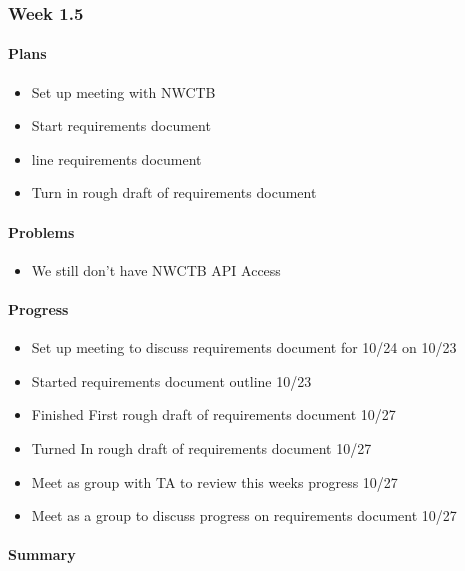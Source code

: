 \documentclass[onecolumn, draftclsnofoot,10pt, compsoc]{article}
\begin{document}
		\subsubsection{Week 1.5}
			\paragraph{Plans} \hfill \break

		        \begin{itemize}
		            \item Set up meeting with NWCTB
		            \item Start requirements document
		            \item line requirements document
		            \item Turn in rough draft of requirements document
		        \end{itemize}

		    \paragraph{Problems} \hfill \break
		        \begin{itemize}
		            \item We still don't have NWCTB API Access
		        \end{itemize}

		    \paragraph{Progress} \hfill \break

		    \begin{itemize}
		        \item Set up meeting to discuss requirements document for 10/24 on 10/23
		        \item Started requirements document outline 10/23
		        \item Finished First rough draft of requirements document 10/27
		        \item Turned In rough draft of requirements document 10/27
		        \item Meet as group with TA to review this weeks progress 10/27
		        \item Meet as a group to discuss progress on requirements document 10/27
		    \end{itemize}

		    \paragraph{Summary}
\end{document}
